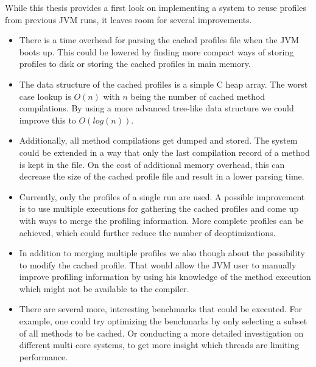 While this thesis provides a first look on implementing a system to reuse profiles from previous JVM runs, it leaves room for several improvements.
\begin{itemize}
  \item There is a time overhead for parsing the cached profiles file when the JVM boots up. This could be lowered by finding more compact ways of storing profiles to disk or storing the cached profiles in main memory.
  \item The data structure of the cached profiles is a simple C heap array. The worst case lookup is $O(n)$ with $n$ being the number of cached method compilations. By using a more advanced tree-like data structure we could improve this to $O(log(n))$.
  \item Additionally, all method compilations get dumped and stored. The system could be extended in a way that only the last compilation record of a method is kept in the file. On the cost of additional memory overhead, this can decrease the size of the cached profile file and result in a lower parsing time.
  \item Currently, only the profiles of a single run are used. A possible improvement is to use multiple executions for gathering the cached profiles and come up with ways to merge the profiling information. More complete profiles can be achieved, which could further reduce the number of deoptimizations.
  \item In addition to merging multiple profiles we also though about the possibility to modify the cached profile. That would allow the JVM user to manually improve profiling information by using his knowledge of the method execution which might not be available to the compiler.
  \item There are several more, interesting benchmarks that could be executed. For example, one could try optimizing the benchmarks by only selecting a subset of all methods to be cached. Or conducting a more detailed investigation on different multi core systems, to get more insight which threads are limiting performance.
\end{itemize}

